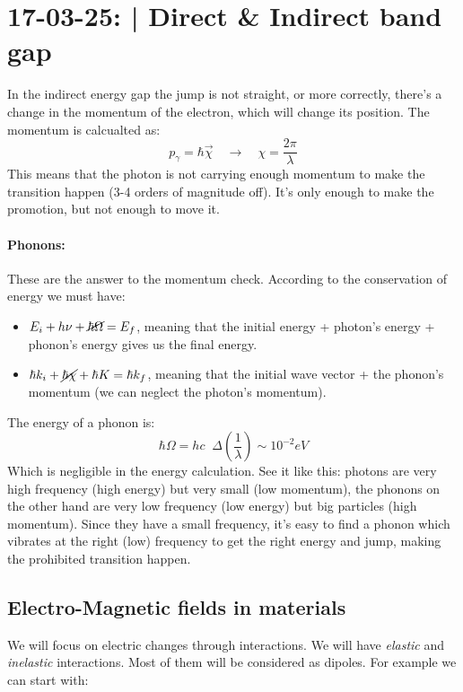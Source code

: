 \section{17-03-25: | Direct \& Indirect band gap}

In the indirect energy gap the jump is not straight, or more correctly, there's a change in the momentum of the electron, which will change its position. The momentum is calcualted as:
\begin{equation}
    p_{\gamma} = \hbar\vec{\chi} \quad \longrightarrow \quad \chi = \frac{2\pi}{\lambda}
\end{equation}
This means that the photon is not carrying enough momentum to make the transition happen (3-4 orders of magnitude off). It's only enough to make the promotion, but not enough to move it.

\paragraph{Phonons:} These are the answer to the momentum check. According to the conservation of energy we must have:
\begin{itemize}
    \item $E_i + h\nu + \cancel{\hbar\Omega} = E_f$, meaning that the initial energy + photon's energy + phonon's energy gives us the final energy.
    \item $\hbar k_i + \cancel{\hbar \chi} + \hbar K = \hbar k_f$, meaning that the initial wave vector + the phonon's momentum (we can neglect the photon's momentum).
\end{itemize} 
The energy of a phonon is:
\begin{equation}
    \hbar \Omega = hc \;\; \Delta \left(\frac{1}{\lambda}\right) \sim 10^{-2}eV
\end{equation}
Which is negligible in the energy calculation. See it like this: photons are very high frequency (high energy) but very small (low momentum), the phonons on the other hand are very low frequency (low energy) but big particles (high momentum).
Since they have a small frequency, it's easy to find a phonon which vibrates at the right (low) frequency to get the right energy and jump, making the prohibited transition happen.

\subsection{Electro-Magnetic fields in materials}

We will focus on electric changes through interactions. We will have \textit{elastic} and \textit{inelastic} interactions. Most of them will be considered as dipoles.
For example we can start with:
